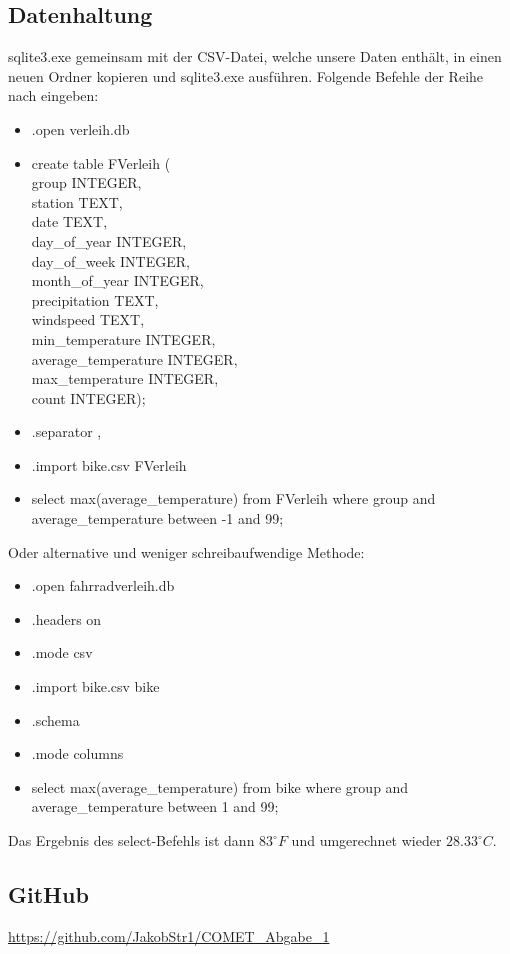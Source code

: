 \documentclass{article}
\begin{document}
\subsection{Datenhaltung}
sqlite3.exe gemeinsam mit der CSV-Datei, welche unsere Daten enthält, in einen neuen Ordner kopieren und  sqlite3.exe ausführen. Folgende Befehle der Reihe nach eingeben:
\begin{itemize}
    \item .open verleih.db
    \item create table FVerleih (\\ \grqq group\grqq{} INTEGER, \\station TEXT, \\date TEXT, \\day\_of\_year INTEGER, \\day\_of\_week INTEGER, \\month\_of\_year INTEGER, \\precipitation TEXT, \\windspeed TEXT, \\min\_temperature INTEGER, \\average\_temperature INTEGER, \\max\_temperature INTEGER, \\count INTEGER);
    \item .separator ,
    \item .import bike.csv FVerleih
    \item select max(average\_temperature) from FVerleih where \grqq group and average\_temperature between -1 and 99;
\end{itemize} 
Oder alternative und weniger schreibaufwendige Methode:
\begin{itemize}
    \item .open fahrradverleih.db
    \item .headers on
    \item .mode csv
    \item .import bike.csv bike
    \item .schema
    \item .mode columns
    \item select max(average\_temperature) from bike where \grqq group and \\average\_temperature between 1 and 99;
\end{itemize}
Das Ergebnis des select-Befehls ist dann ${83}^\circ F$ und umgerechnet wieder ${28.33}^\circ C$.
\subsection{GitHub}
\url{https://github.com/JakobStr1/COMET_Abgabe_1}


\newpage
 

\end{document}
